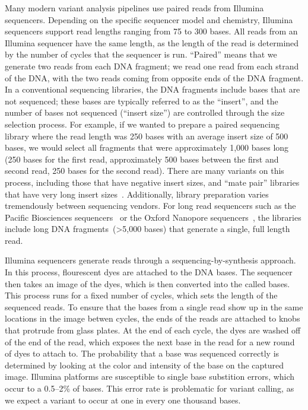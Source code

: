 \documentclass[phd]{ucbthesis}
\begin{document}
Many modern variant analysis pipelines use paired reads from Illumina
sequencers. Depending on the specific sequencer model and chemistry, Illumina
sequencers support read lengths ranging from 75 to 300 bases. All reads from an
Illumina sequencer have the same length, as the length of the read is determined
by the number of cycles that the sequencer is run. ``Paired''  means that we
generate two reads from each DNA fragment; we read one read from each strand of
the DNA, with the two reads coming from opposite ends of the DNA fragment.
In a conventional sequencing libraries, the DNA fragments include bases that are
not sequenced; these bases are typically referred to as the ``insert'', and the
number of bases not sequenced (``insert size'') are controlled through the
size selection process. For example, if we wanted to prepare a paired sequencing
library where the read length was 250 bases with an average insert size of 500
bases, we would select all fragments that were approximately 1,000 bases long
(250 bases for the first read, approximately 500 bases between the first and
second read, 250 bases for the second read). There are many variants on this
process, including those that have negative insert sizes, and ``mate pair''
libraries that have very long insert sizes~\cite{mardis13}. Additionally,
library preparation varies tremendously between sequencing vendors. For long
read sequencers such as the Pacific Biosciences sequencers~\cite{eid09} or
the Oxford Nanopore sequencers~\cite{clarke09}, the libraries include long DNA
fragments~(>5,000 bases) that generate a single, full length read.

Illumina sequencers generate reads through a sequencing-by-synthesis approach.
In this process, flourescent dyes are attached to the DNA bases. The sequencer
then takes an image of the dyes, which is then converted into the called bases.
This process runs for a fixed number of cycles, which sets the length of the
sequenced reads. To ensure that the bases from a single read show up in the same
locations in the image betwen cycles, the ends of the reads are attached to
knobs that protrude from glass plates. At the end of each cycle, the dyes are
washed off of the end of the read, which exposes the next base in the read for
a new round of dyes to attach to. The probability that a base was sequenced
correctly is determined by looking at the color and intensity of the base on
the captured image. Illumina platforms are susceptible to single base substition
errors, which occur to a 0.5--2\% of bases. This error rate is problematic for
variant calling, as we expect a variant to occur at one in every one thousand
bases.
\end{document}
